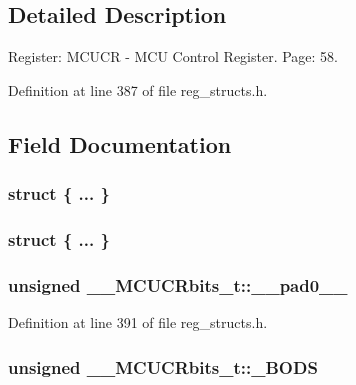 \subsection{Detailed Description}
Register\+: M\+C\+U\+C\+R -\/ M\+C\+U Control Register. Page\+: 58. 

Definition at line 387 of file reg\+\_\+structs.\+h.



\subsection{Field Documentation}
\hypertarget{union_____m_c_u_c_rbits__t_ad55d6758c6b457ede332cbfee75c017e}{\subsubsection[{"@93}]{\setlength{\rightskip}{0pt plus 5cm}struct \{ ... \} }}\label{union_____m_c_u_c_rbits__t_ad55d6758c6b457ede332cbfee75c017e}
\hypertarget{union_____m_c_u_c_rbits__t_a633d8703e3a41aa935cca19860a2c1a3}{\subsubsection[{"@95}]{\setlength{\rightskip}{0pt plus 5cm}struct \{ ... \} }}\label{union_____m_c_u_c_rbits__t_a633d8703e3a41aa935cca19860a2c1a3}
\hypertarget{union_____m_c_u_c_rbits__t_adbd03c329f61dc158c08a3180d499b1b}{
\subsubsection[{\+\_\+\+\_\+pad0\+\_\+\+\_\+}]{\setlength{\rightskip}{0pt plus 5cm}unsigned \+\_\+\+\_\+\+M\+C\+U\+C\+Rbits\+\_\+t\+::\+\_\+\+\_\+pad0\+\_\+\+\_\+}}\label{union_____m_c_u_c_rbits__t_adbd03c329f61dc158c08a3180d499b1b}


Definition at line 391 of file reg\+\_\+structs.\+h.

\hypertarget{union_____m_c_u_c_rbits__t_a603ae63222bf031a4c5e385690944bae}{
\subsubsection[{\+\_\+\+B\+O\+D\+S}]{\setlength{\rightskip}{0pt plus 5cm}unsigned \+\_\+\+\_\+\+M\+C\+U\+C\+Rbits\+\_\+t\+::\+\_\+\+B\+O\+D\+S}}\label{union_____m_c_u_c_rbits__t_a603ae63222bf031a4c5e385690944bae}


